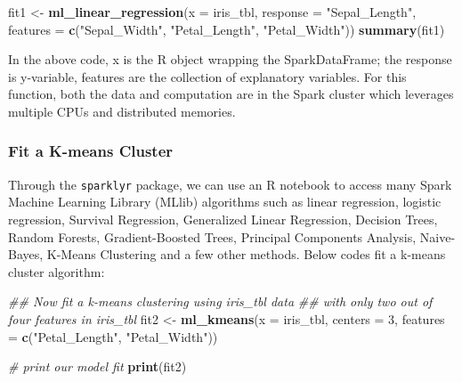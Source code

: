 \documentclass[
]{article}
\newenvironment{Shaded}{\begin{snugshade}}{\end{snugshade}}
\newcommand{\CommentTok}[1]{\textcolor[rgb]{0.56,0.35,0.01}{\textit{#1}}}
\newcommand{\DataTypeTok}[1]{\textcolor[rgb]{0.13,0.29,0.53}{#1}}
\newcommand{\DecValTok}[1]{\textcolor[rgb]{0.00,0.00,0.81}{#1}}
\newcommand{\KeywordTok}[1]{\textcolor[rgb]{0.13,0.29,0.53}{\textbf{#1}}}
\newcommand{\NormalTok}[1]{#1}
\newcommand{\StringTok}[1]{\textcolor[rgb]{0.31,0.60,0.02}{#1}}
\begin{document}
\begin{Shaded}
\begin{Highlighting}[]
\NormalTok{fit1 <-}\StringTok{  }\KeywordTok{ml_linear_regression}\NormalTok{(}\DataTypeTok{x =}\NormalTok{ iris_tbl, }\DataTypeTok{response =} \StringTok{"Sepal_Length"}\NormalTok{, }
                              \DataTypeTok{features =} \KeywordTok{c}\NormalTok{(}\StringTok{"Sepal_Width"}\NormalTok{, }\StringTok{"Petal_Length"}\NormalTok{, }\StringTok{"Petal_Width"}\NormalTok{))}
\KeywordTok{summary}\NormalTok{(fit1)}
\end{Highlighting}
\end{Shaded}

In the above code, x is the R object wrapping the SparkDataFrame; the
response is y-variable, features are the collection of explanatory
variables. For this function, both the data and computation are in the
Spark cluster which leverages multiple CPUs and distributed memories.

\hypertarget{fit-a-k-means-cluster}{%
\subsubsection{Fit a K-means Cluster}\label{fit-a-k-means-cluster}}

Through the \texttt{sparklyr} package, we can use an R notebook to
access many Spark Machine Learning Library (MLlib) algorithms such as
linear regression, logistic regression, Survival Regression, Generalized
Linear Regression, Decision Trees, Random Forests, Gradient-Boosted
Trees, Principal Components Analysis, Naive-Bayes, K-Means Clustering
and a few other methods. Below codes fit a k-means cluster algorithm:

\begin{Shaded}
\begin{Highlighting}[]
\CommentTok{## Now fit a k-means clustering using iris_tbl data }
\CommentTok{## with only two out of four features in iris_tbl}
\NormalTok{fit2 <-}\StringTok{ }\KeywordTok{ml_kmeans}\NormalTok{(}\DataTypeTok{x =}\NormalTok{ iris_tbl, }\DataTypeTok{centers =} \DecValTok{3}\NormalTok{, }
                  \DataTypeTok{features =} \KeywordTok{c}\NormalTok{(}\StringTok{"Petal_Length"}\NormalTok{, }\StringTok{"Petal_Width"}\NormalTok{))}

\CommentTok{# print our model fit}
\KeywordTok{print}\NormalTok{(fit2)}
\end{Highlighting}
\end{Shaded}
\end{document}
